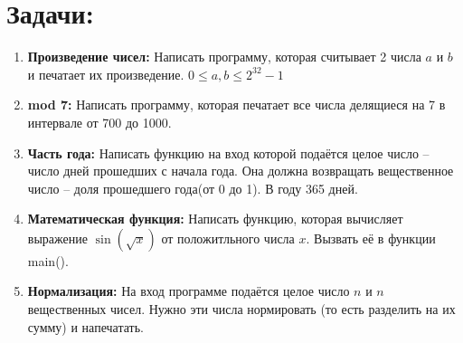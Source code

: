 \documentclass{article}
\begin{document}

\section*{Задачи:}
\begin{enumerate}
\item \textbf{Произведение чисел:} Написать программу, которая считывает 2 числа $a$ и $b$ и печатает их произведение. $0 \le a, b \le 2^{32}-1$
\item \textbf{mod 7:} Написать программу, которая печатает все числа делящиеся на 7 в интервале от 700 до 1000.
\item \textbf{Часть года:} Написать функцию на вход которой подаётся целое число -- число дней прошедших с начала года. Она должна возвращать вещественное число -- доля прошедшего года(от 0 до 1). В году 365 дней.
\item \textbf{Математическая функция:} Написать функцию, которая вычисляет выражение $\sin(\sqrt{x})$ от положитльного числа $x$. Вызвать её в функции main().
\item \textbf{Нормализация:} На вход программе подаётся целое число $n$ и $n$ вещественных чисел. Нужно эти числа нормировать (то есть разделить на их сумму) и напечатать.

\end{enumerate}
\end{document}
